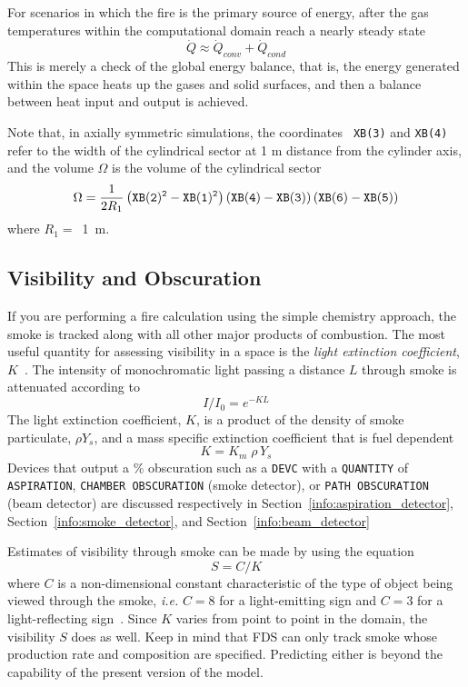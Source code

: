 \documentclass[11pt]{book}
\newcommand{\ct}{\tt\small}
\newcommand{\be}{\begin{equation}}
\newcommand{\ee}{\end{equation}}
\begin{document}
For scenarios in which the fire is the primary source of energy, after
the gas temperatures within the computational domain reach a nearly
steady state
\be \dot{Q} \approx \dot{Q}_{conv} + \dot{Q}_{cond}  \ee
This is merely a check of the global energy balance, that is, the
energy generated within the space heats up the gases and solid
surfaces, and then a balance between heat input and output is
achieved.

Note that, in axially symmetric simulations, the coordinates {\ct
XB(3)} and {\ct XB(4)} refer to the width of the cylindrical sector
at 1 m distance from the cylinder axis, and the volume $\Omega$ is
the volume of the cylindrical sector
\be
\Omega = \frac{1}{2 R_1}\left({\ct XB(2)^2-XB(1)^2}\right)
            \left({\ct XB(4)-XB(3)}\right)
            \left({\ct XB(6)-XB(5)}\right)
\ee
where $R_1 = $~1~m.


\subsection{Visibility and Obscuration}
\label{info:visibility}
\label{info:obscuration}

If you are performing a fire calculation using the simple chemistry
approach, the smoke is tracked along with all other major products of
combustion. The most useful quantity for assessing visibility in a
space is the {\em light extinction coefficient},
$K$~\cite{SFPE:Mulholland}. The intensity of monochromatic light
passing a distance $L$ through smoke is attenuated according to
\be I/I_0 = e^{-KL} \ee
The light extinction coefficient, $K$, is a product of the
density of smoke particulate, $\rho Y_s$, and a mass specific
extinction coefficient that is fuel dependent
\be K = K_m \; \rho \, Y_s \label{mec} \ee
Devices that output a \% obscuration such as a {\ct DEVC} with a {\ct QUANTITY} of {\ct ASPIRATION}, {\ct CHAMBER OBSCURATION} (smoke
detector), or {\ct PATH OBSCURATION} (beam detector) are discussed
respectively in Section~\ref{info:aspiration_detector},
Section~\ref{info:smoke_detector}, and Section~\ref{info:beam_detector}

Estimates of visibility through smoke can be made by using the
equation
\be  S = C/K  \label{vis}  \ee
where $C$ is a non-dimensional constant characteristic of
the type of object being viewed through the smoke, {\em i.e.}
$C=8$ for a light-emitting sign and $C=3$ for a light-reflecting
sign~\cite{SFPE:Mulholland}. Since $K$ varies from point to point in the
domain, the visibility $S$ does as well. Keep in mind that
FDS can only track smoke whose production rate and composition
are specified. Predicting either is beyond the
capability of the present version of the model.
\end{document}
